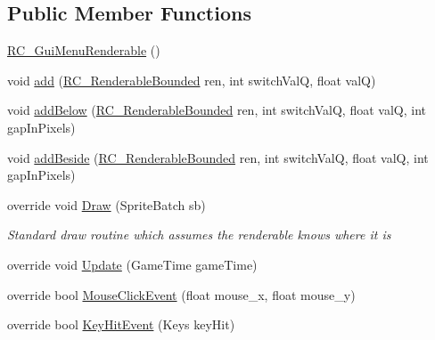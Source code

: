\subsection*{Public Member Functions}
\begin{DoxyCompactItemize}
\item 
\mbox{\hyperlink{class_r_c___framework_1_1_r_c___gui_menu_renderable_a6edd694fec762aa24a713e2b1e567ad0}{R\+C\+\_\+\+Gui\+Menu\+Renderable}} ()
\item 
void \mbox{\hyperlink{class_r_c___framework_1_1_r_c___gui_menu_renderable_a6e04c0167c6de417d89aaeb8cfd01585}{add}} (\mbox{\hyperlink{class_r_c___framework_1_1_r_c___renderable_bounded}{R\+C\+\_\+\+Renderable\+Bounded}} ren, int switch\+ValQ, float valQ)
\item 
void \mbox{\hyperlink{class_r_c___framework_1_1_r_c___gui_menu_renderable_a112c9577a1d1ac24d3eb3f308fc86191}{add\+Below}} (\mbox{\hyperlink{class_r_c___framework_1_1_r_c___renderable_bounded}{R\+C\+\_\+\+Renderable\+Bounded}} ren, int switch\+ValQ, float valQ, int gap\+In\+Pixels)
\item 
void \mbox{\hyperlink{class_r_c___framework_1_1_r_c___gui_menu_renderable_a04e2e8f730550afb71db6f700f059996}{add\+Beside}} (\mbox{\hyperlink{class_r_c___framework_1_1_r_c___renderable_bounded}{R\+C\+\_\+\+Renderable\+Bounded}} ren, int switch\+ValQ, float valQ, int gap\+In\+Pixels)
\item 
override void \mbox{\hyperlink{class_r_c___framework_1_1_r_c___gui_menu_renderable_a0c74b42e4af1cad77f708cfa174aa724}{Draw}} (Sprite\+Batch sb)
\begin{DoxyCompactList}\small\item\em Standard draw routine which assumes the renderable knows where it is \end{DoxyCompactList}\item 
override void \mbox{\hyperlink{class_r_c___framework_1_1_r_c___gui_menu_renderable_af69df1292acc0f8babaa578caebffd87}{Update}} (Game\+Time game\+Time)
\item 
override bool \mbox{\hyperlink{class_r_c___framework_1_1_r_c___gui_menu_renderable_a211b5eebda9524d97f8dfeb1f8024f32}{Mouse\+Click\+Event}} (float mouse\+\_\+x, float mouse\+\_\+y)
\item 
override bool \mbox{\hyperlink{class_r_c___framework_1_1_r_c___gui_menu_renderable_a2a1be820f5693b0badd408b5457c81bd}{Key\+Hit\+Event}} (Keys key\+Hit)
\end{DoxyCompactItemize}
